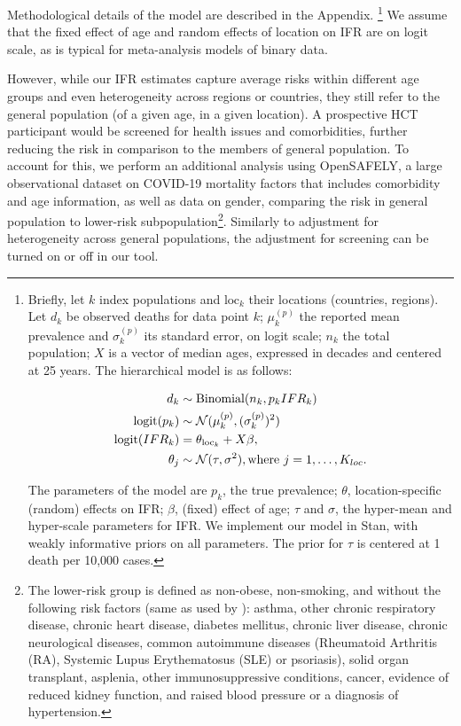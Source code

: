 \documentclass{article}
\begin{document}
Methodological details of the model are described in the Appendix.
\footnote{\noindent Briefly, let $k$ index populations and $\text{loc}_k$ their locations (countries, regions). Let $d_k$ be observed deaths for data point $k$;  $\mu^{(p)}_k$ the reported mean prevalence and $\sigma^{(p)}_k$ its standard error, on logit scale; $n_k$ the total population; $X$ is a vector of median ages, expressed in decades and centered at 25 years. The hierarchical model is as follows:

\begin{align}
d_k & \sim \text{Binomial}(n_k, p_kIFR_k) \\
\text{logit}(p_k) & \sim \mathcal{N}(\mu^{(p)}_k, (\sigma^{(p)}_k)^2) \\
\text{logit}(IFR_k) &= \theta_{\text{loc}_k} + X\beta, \\
\theta_j & \sim \mathcal{N}(\tau, \sigma^2), \bigskip \text{where } j=1,\ldots,K_{loc}.
\end{align}

\noindent The parameters of the model are $p_k$, the true prevalence; $\theta$, location-specific (random) effects on IFR; $\beta$, (fixed) effect of age; $\tau$ and $\sigma$, the hyper-mean and hyper-scale parameters for IFR. We implement our model in Stan\cite{carpenter2017stan}, with weakly informative priors on all parameters. The prior for $\tau$ is centered at 1 death per 10,000 cases.}
We assume that the fixed effect of age and random effects of location on IFR are on logit scale, as is typical for meta-analysis models of binary data. 

However, while our IFR estimates capture average risks within different age groups and even heterogeneity across regions or countries, they still refer to the general population (of a given age, in a given location). A prospective HCT participant would be screened for health issues and comorbidities, further reducing the risk in comparison to the members of general population. To account for this, we perform an additional analysis using OpenSAFELY\cite{williamson_factors_2020}, a large observational dataset on COVID-19 mortality factors that includes comorbidity and age information, as well as data on gender, comparing the risk in general population to lower-risk subpopulation\footnote{The lower-risk group is defined as non-obese, non-smoking, and without the following risk factors (same as used by \cite{williamson_factors_2020}): asthma, other chronic respiratory disease, chronic heart disease, diabetes mellitus, chronic liver disease, chronic neurological diseases, common autoimmune diseases (Rheumatoid Arthritis (RA), Systemic Lupus Erythematosus (SLE) or psoriasis), solid organ transplant, asplenia, other immunosuppressive conditions, cancer, evidence of reduced kidney function, and raised blood pressure or a diagnosis of hypertension.}. Similarly to adjustment for heterogeneity across general populations, the adjustment for screening can be turned on or off in our tool.
\end{document}
